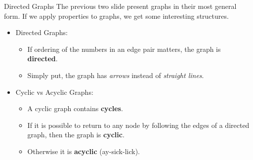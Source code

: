 \documentclass[11pt]{beamer}
\begin{document}
\begin{frame}{Directed Graphs}
The previous two slide present graphs in their most general form.  If we apply properties to graphs, we get some interesting structures.  
\begin{itemize}
\item Directed Graphs:
\begin{itemize}
\item If ordering of the numbers in an edge pair matters, the graph is \textbf{directed}.  
\item Simply put, the graph has \emph{arrows} instead of \emph{straight lines}.  
\end{itemize}
\item Cyclic vs Acyclic Graphs:
\begin{itemize}
\item A cyclic graph contains \textbf{cycles}.
\item If it is possible to return to any node by following the edges of a directed graph, then the graph is \textbf{cyclic}.
\item Otherwise it is \textbf{acyclic} (ay-sick-lick).
\end{itemize}
\end{itemize}
\end{frame}
\end{document}
